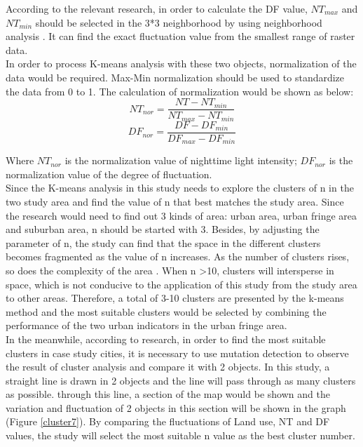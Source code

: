 According to the relevant research, in order to calculate the DF value, $NT_{max}$ and $NT_{min}$ should be selected in the 3*3 neighborhood by using neighborhood analysis \parencite{feng_using_2020}. It can find the exact fluctuation value from the smallest range of raster data.\\

In order to process K-means analysis with these two objects, normalization of the data would be required. Max-Min normalization should be used to standardize the data from 0 to 1. The calculation of normalization would be shown as below:\\

\begin{equation}
NT_{nor}=\frac{NT-NT_{min}}{NT_{max}-NT_{min}}
\end{equation}
\begin{equation}
DF_{nor}=\frac{DF-DF_{min}}{DF_{max}-DF_{min}}
\end{equation}

Where $NT_{nor}$ is the normalization value of nighttime light intensity; $DF_{nor}$ is the normalization value of the degree of fluctuation.\\

Since the K-means analysis in this study needs to explore the clusters of n in the two study area and find the value of n that best matches the study area. Since the research would need to find out 3 kinds of area: urban area, urban fringe area and suburban area, n should be started with 3. Besides, by adjusting the parameter of n, the study can find that the space in the different clusters becomes fragmented as the value of n increases. As the number of clusters rises, so does the complexity of the area \parencite{yang_spatial_2017}. When n \textgreater 10, clusters will intersperse in space, which is not conducive to the application of this study from the study area to other areas. Therefore, a total of 3-10 clusters are presented by the k-means method and the most suitable clusters would be selected by combining the performance of the two urban indicators in the urban fringe area. \\

In the meanwhile, according to research, in order to find the most suitable clusters in case study cities, it is necessary to use mutation detection to observe the result of cluster analysis and compare it with 2 objects. In this study, a straight line is drawn in 2 objects and the line will pass through as many clusters as possible. through this line, a section of the map would be shown and the variation and fluctuation of 2 objects in this section will be shown in the graph (Figure \ref{cluster7}). By comparing the fluctuations of Land use, NT and DF values, the study will select the most suitable n value as the best cluster number.\\

